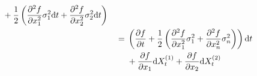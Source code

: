 \documentclass{homework}
\begin{document}
\begin{subproblem}[(\alph*)]
\begin{equation}
\begin{aligned}
\begin{aligned}[t]
            &+\frac{1}{2}\left(
                \frac{\partial^2 f}{\partial x_1^2}\sigma_1^2\mathrm d t
                +\frac{\partial^2 f}{\partial x_2^2}\sigma_2^2\mathrm d t
            \right)
            \end{aligned}\\
            &=\begin{aligned}[t]
            &\left(
                \frac{\partial f}{\partial t}+     
                \frac{1}{2}\left(
                \frac{\partial^2 f}{\partial x_1^2}\sigma_1^2
                +\frac{\partial^2 f}{\partial x_n^2}\sigma_n^2
                \right)
            \right)\mathrm d t\\
            &+\frac{\partial f}{\partial x_1}\mathrm d X_t^{(1)}
            +\frac{\partial f}{\partial x_2}\mathrm d X_t^{(2)}
            \end{aligned}
            \end{aligned}
        \end{equation}


\end{subproblem}
\end{document}
